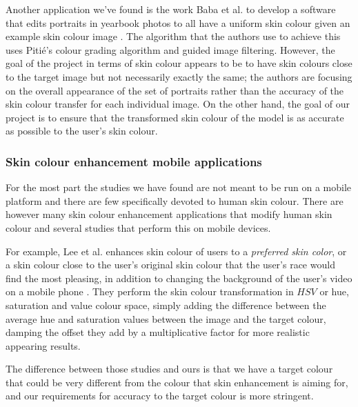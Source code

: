 Another application we've found is the work Baba et al. to develop a software that edits portraits in yearbook photos to all have a uniform skin colour given an example skin colour image \cite{baba_2015_yearbook}. The algorithm that the authors use to achieve this uses Pitié's colour grading algorithm and guided image filtering. However, the goal of the project in terms of skin colour appears to be to have skin colours close to the target image but not necessarily exactly the same; the authors are focusing on the overall appearance of the set of portraits rather than the accuracy of the skin colour transfer for each individual image. On the other hand, the goal of our project is to ensure that the transformed skin colour of the model is as accurate as possible to the user's skin colour.

\subsubsection{Skin colour enhancement mobile applications}
For the most part the studies we have found are not meant to be run on a mobile platform and there are few specifically devoted to human skin colour. There are however many skin colour enhancement applications that modify human skin colour and several studies that perform this on mobile devices.

For example, Lee et al. enhances skin colour of users to a \textit{preferred skin color}, or a skin colour close to the user's original skin colour that the user's race would find the most pleasing, in addition to changing the background of the user's video on a mobile phone \cite{lee_2010_mobile}. They perform the skin colour transformation in $HSV$ or hue, saturation and value colour space, simply adding the difference between the average hue and saturation values between the image and the target colour, damping the offset they add by a multiplicative factor for more realistic appearing results. 

The difference between those studies and ours is that we have a target colour that could be very different from the colour that skin enhancement is aiming for, and our requirements for accuracy to the target colour is more stringent.

